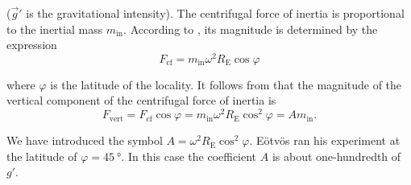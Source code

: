 \noindent
($\vec{g}'$ is the gravitational intensity). The centrifugal force of inertia is proportional to the inertial mass $m_{\text{in}}$. According to , its magnitude is determined by the expression
\begin{equation*}
	F_{\text{cf}} = m_{\text{in}}\omega^2R_{\text{E}}\cos\varphi
\end{equation*}

\noindent
where $\varphi$ is the latitude of the locality. It follows from  that the magnitude of the vertical component of the centrifugal force of inertia is
\begin{equation*}
	F_{\text{vert}} = F_{\text{cf}}\cos\varphi =  m_{\text{in}}\omega^2R_{\text{E}}\cos^2\varphi = Am_{\text{in}}.
\end{equation*}

\noindent
We have introduced the symbol $A=\omega^2R_{\text{E}}\cos^2\varphi$. E\"{o}tv\"{o}s ran his experiment at the latitude of $\varphi=\SI{45}{\degree}$. In this case the coefficient $A$ is about one-hundredth of $g'$.

